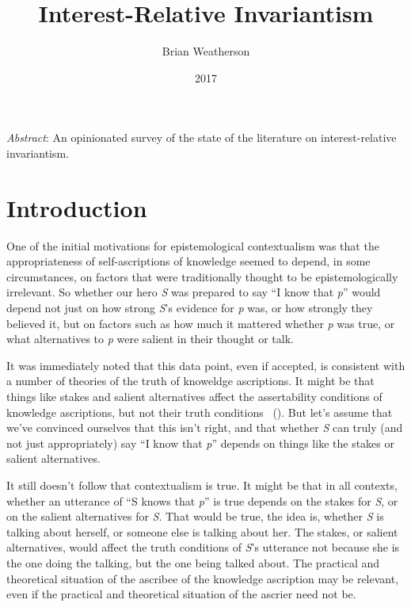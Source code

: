 \documentclass[
  11pt,
  letterpaper,
  DIV=11,
  numbers=noendperiod,
  twoside]{scrartcl}
\title{Interest-Relative Invariantism}
\author{Brian Weatherson}
\date{2017}
\renewenvironment{abstract}
 {\vspace{-1.25cm}
 \quotation\small\noindent\emph{Abstract}:}
 {\endquotation}
\renewenvironment{abstract}
 {\quotation\small\noindent\emph{Abstract}:}
 {\endquotation\vspace{-0.02cm}}
\begin{document}
\maketitle
\begin{abstract}
An opinionated survey of the state of the literature on
interest-relative invariantism.
\end{abstract}


\section{Introduction}\label{introduction}

One of the initial motivations for epistemological contextualism was
that the appropriateness of self-ascriptions of knowledge seemed to
depend, in some circumstances, on factors that were traditionally
thought to be epistemologically irrelevant. So whether our hero \emph{S}
was prepared to say ``I know that \emph{p}'' would depend not just on
how strong \emph{S}'s evidence for \emph{p} was, or how strongly they
believed it, but on factors such as how much it mattered whether
\emph{p} was true, or what alternatives to \emph{p} were salient in
their thought or talk.

It was immediately noted that this data point, even if accepted, is
consistent with a number of theories of the truth of knoweldge
ascriptions. It might be that things like stakes and salient
alternatives affect the assertability conditions of knowledge
ascriptions, but not their truth conditions
~(). But let's assume that we've
convinced ourselves that this isn't right, and that whether \emph{S} can
truly (and not just appropriately) say ``I know that \emph{p}'' depends
on things like the stakes or salient alternatives.

It still doesn't follow that contextualism is true. It might be that in
all contexts, whether an utterance of ``S knows that \emph{p}'' is true
depends on the stakes for \emph{S}, or on the salient alternatives for
\emph{S}. That would be true, the idea is, whether \emph{S} is talking
about herself, or someone else is talking about her. The stakes, or
salient alternatives, would affect the truth conditions of \emph{S}'s
utterance not because she is the one doing the talking, but the one
being talked about. The practical and theoretical situation of the
ascribee of the knowledge ascription may be relevant, even if the
practical and theoretical situation of the ascrier need not be.
\end{document}

